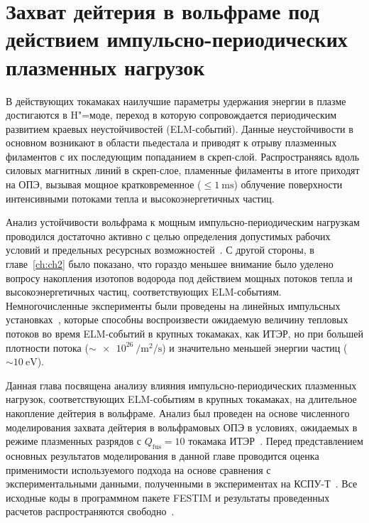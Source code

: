 \chapter{Захват дейтерия в вольфраме под действием импульсно-периодических плазменных нагрузок}\label{ch:ch3}

В действующих токамаках наилучшие параметры удержания энергии в плазме достигаются в H"=моде, переход в которую сопровождается периодическим развитием краевых неустойчивостей (ELM-событий). Данные неустойчивости в основном возникают в области пьедестала и приводят к отрыву плазменных филаментов с их последующим попаданием в скреп-слой. Распространяясь вдоль силовых магнитных линий в скреп-слое, пламенные филаменты в итоге приходят на ОПЭ, вызывая мощное кратковременное (\( \leq \SI{1}{\milli\second} \)) облучение поверхности интенсивными потоками тепла и высокоэнергетичных частиц.

Анализ устойчивости вольфрама к мощным импульсно-периодическим нагрузкам проводился достаточно активно с целью определения допустимых рабочих условий и предельных ресурсных возможностей~\cite{Pintsuk2012,Budaev2015,Rieth2019}. С другой стороны, в главе~\cref{ch:ch2} было показано, что гораздо меньшее внимание было уделено вопросу накопления изотопов водорода под действием мощных потоков тепла и высокоэнергетичных частиц, соответствующих ELM-событиям. Немногочисленные эксперименты были проведены на линейных импульсных установках~\cite{Poskakalov2020,Ogorodnikova,Nishijima2011}, которые способны воспроизвести ожидаемую величину тепловых потоков во время ELM-событий в крупных токамаках, как ИТЭР, но при большей плотности потока (\(\sim\SI{e26}{\per\meter\squared\per\second}\)) и значительно меньшей энергии частиц (\(\sim\SI{10}{\electronvolt}\)). 

Данная глава посвящена анализу влияния импульсно-периодических плазменных нагрузок, соответствующих ELM-событиям в крупных токамаках, на длительное накопление дейтерия в вольфраме. Анализ был проведен на основе численного моделирования захвата дейтерия в вольфрамовых ОПЭ в условиях, ожидаемых в режиме плазменных разрядов с \(Q_\mathrm{fus}=\num{10}\) токамака ИТЭР~\cite{Kulagin2025_JNM}. Перед представлением основных результатов моделирования в данной главе проводится оценка применимости используемого подхода на основе сравнения с экспериментальными данными, полученными в экспериментах на КСПУ-Т~\cite{Poskakalov2020}. Все исходные коды в программном пакете FESTIM и результаты проведенных расчетов распространяются свободно~\cite{Kulagin_PhD_2025}.

